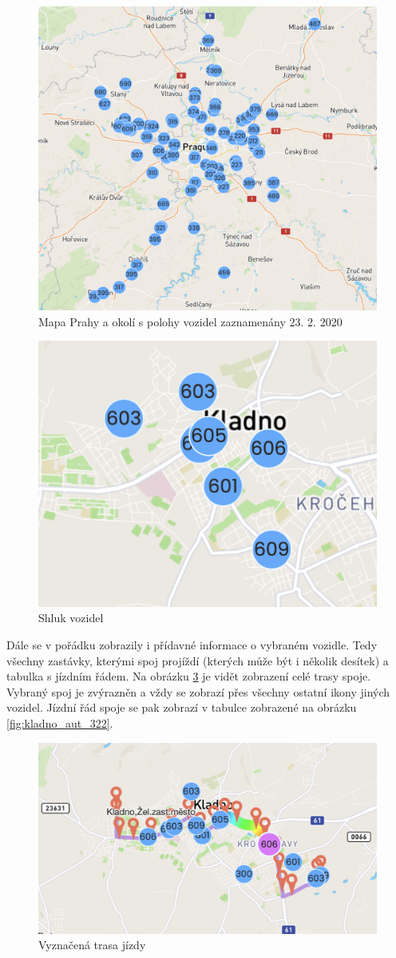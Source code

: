 \begin{figure}
   \centering
 \includegraphics[width=0.7\linewidth]{../img/big_picture.png}
 \caption{Mapa Prahy a okolí s polohy vozidel zaznamenány 23. 2. 2020}
 \label{fig:big_picture}
\end{figure}


\begin{figure}
   \centering
 \includegraphics[width=0.3\linewidth]{../img/cluster.png}
 \caption{Shluk vozidel}
 \label{fig:cluster}
\end{figure}




\bigbreak


Dále se v pořádku zobrazily i přídavné informace o vybraném vozidle. Tedy všechny zastávky, kterými spoj projíždí (kterých může být i několik desítek) a tabulka s jízdním řádem. Na obrázku \ref{fig:trip_path} je vidět zobrazení celé trasy spoje. Vybraný spoj je zvýrazněn a vždy se zobrazí přes všechny ostatní ikony jiných vozidel. Jízdní řád spoje se pak zobrazí v tabulce zobrazené na obrázku \ref{fig:kladno_aut_322}.


\begin{figure}
   \centering
 \includegraphics[width=0.7\linewidth]{../img/trip_path.png}
 \caption{Vyznačená trasa jízdy}
 \label{fig:trip_path}
\end{figure}


